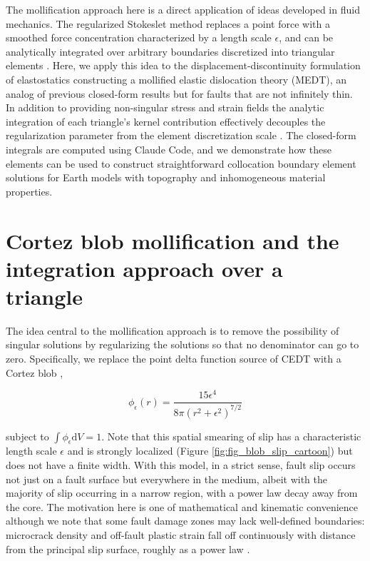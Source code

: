 \documentclass[12pt]{article}
\newcommand{\eps}{\epsilon}
\newcommand{\dd}{\mathrm{d}}
\begin{document}
The mollification approach here is a direct application of ideas developed in fluid mechanics.  The regularized Stokeslet method \citep{Cortez2001, CortezFauciMedovikov2005} replaces a point force with a smoothed force concentration characterized by a length scale $\eps$, and can be analytically integrated over arbitrary boundaries discretized into triangular elements \citep{FerrantiCortez2024}.  Here, we apply this idea to the displacement-discontinuity formulation of elastostatics constructing a mollified elastic dislocation theory (MEDT), an analog of previous closed-form results \citep[e.g.,][]{NikkhooWalter2015} but for faults that are not infinitely thin. In addition to providing non-singular stress and strain fields the analytic integration of each triangle's kernel contribution effectively decouples the regularization parameter from the element discretization scale \citep{FerrantiCortez2024}.  The closed-form integrals are computed using Claude Code, and we demonstrate how these elements can be used to construct straightforward collocation boundary element solutions for Earth models with topography and inhomogeneous material properties. 


\section{Cortez blob mollification and the integration approach over a triangle}
The idea central to the mollification approach is to remove the possibility of singular solutions by regularizing the solutions so that no denominator can go to zero.  Specifically, we replace the point delta function source of CEDT with a Cortez blob \citep{Cortez2001},

\begin{equation}
  \phi_\eps(r) = \frac{15 \eps^4}{8\pi (r^2+\eps^2)^{7/2}}
\end{equation}

subject to $\int \phi_\eps \dd V = 1$. Note that this spatial smearing of slip has a characteristic length scale $\eps$ and is strongly localized (Figure \ref{fig:fig_blob_slip_cartoon}) but does not have a finite width. With this model, in a strict sense, fault slip occurs not just on a fault surface but everywhere in the medium, albeit with the majority of slip occurring in a narrow region, with a power law decay away from the core.  The motivation here is one of mathematical and kinematic convenience although we note that some fault damage zones may lack well-defined boundaries: microcrack density and off-fault plastic strain fall off continuously with distance from the principal slip surface, roughly as a power law \citep[e.g.,][]{SavageBrodsky2011, MitchellFaulkner2009, FaulknerEtAl2010}.
\end{document}
